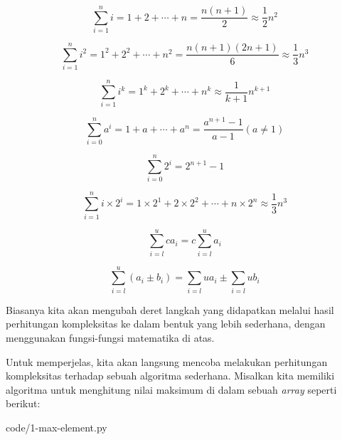 \begin{equation}\label{eq:common-3}
    \sum\limits_{i=1}^n i = 1 + 2 + \cdots + n = \frac{n(n + 1)}{2} \approx \frac{1}{2}n^2
\end{equation}

\begin{equation}\label{eq:common-4}
    \sum\limits_{i=1}^n i^2 = 1^2 + 2^2 + \cdots + n^2 = \frac{n(n + 1)(2n + 1)}{6} \approx \frac{1}{3}n^3
\end{equation}

\begin{equation}\label{eq:common-5}
    \sum\limits_{i=1}^n i^k = 1^k + 2^k + \cdots + n^k \approx \frac{1}{k + 1}n^{k+1}
\end{equation}

\begin{equation}\label{eq:common-6}
    \sum\limits_{i=0}^n a^i = 1 + a + \cdots + a^n = \frac{a^{n + 1} - 1}{a - 1}(a \neq 1)
\end{equation}

\begin{equation}\label{eq:common-7}
    \sum\limits_{i=0}^n 2^i = 2^{n + 1} - 1
\end{equation}

\begin{equation}\label{eq:common-8}
    \sum\limits_{i=1}^n i \times 2^i = 1 \times 2^1 + 2 \times 2^2 + \cdots + n \times 2^n \approx \frac{1}{3}n^3
\end{equation}

\begin{equation}\label{eq:common-9}
    \sum\limits_{i=l}^u ca_i = c \sum\limits_{i=l}^u a_i
\end{equation}

\begin{equation}\label{eq:common-10}
    \sum\limits_{i=l}^u (a_i \pm b_i) = \sum\limits_{i=l}{u} a_i \pm \sum\limits_{i=l}{u} b_i
\end{equation}

Biasanya kita akan mengubah deret langkah yang didapatkan melalui hasil perhitungan kompleksitas ke dalam bentuk yang lebih sederhana, dengan menggunakan fungsi-fungsi matematika di atas.

Untuk memperjelas, kita akan langsung mencoba melakukan perhitungan kompleksitas terhadap sebuah algoritma sederhana. Misalkan kita memiliki algoritma untuk menghitung nilai maksimum di dalam sebuah \textit{array} seperti berikut:


                {code/1-max-element.py}


